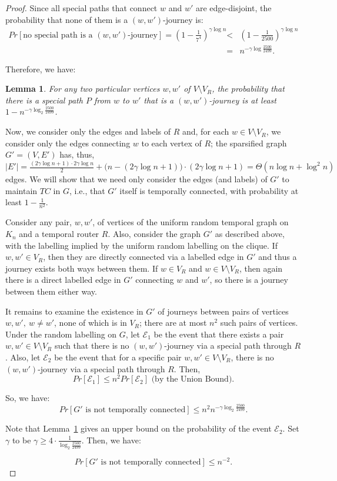 \documentclass[a4paper,UKenglish]{article}
\newtheorem{lemma}{Lemma}
\begin{document}
\begin{proof}
Since all special paths that connect $w$ and $w'$ are edge-disjoint, the probability that none of them is a $(w,w')$-journey is:
\begin{eqnarray*}
Pr[\text{no special path is a }(w,w') \text{-journey}] = \left( 1- \frac{1}{7^4} \right)^{\gamma \log{n}} &<& \left( 1- \frac{1}{2500} \right)^{\gamma \log{n}} \\
 &=&  n^{-\gamma \log{\frac{2500}{2499}}}.
\end{eqnarray*}

Therefore, we have:
\begin{lemma}\label{lem:no_journey}
For any two particular vertices $w,w'$ of $V\setminus V_R$, the probability that there is a special path $P$ from $w$ to $w'$ that is a $(w,w')$-journey is at least $1-n^{-\gamma \log_2{\frac{2500}{2499}}}$.
\end{lemma}

Now, we consider only the edges and labels of $R$ and, for each $w\in V\setminus V_R$, we consider only the edges connecting $w$ to each vertex of $R$; the sparsified graph $G'=(V,E')$ has, thus, $|E'|= \frac{(2\gamma \log{n} +1) \cdot 2 \gamma \log{n}}{2} +\big( n-(2\gamma \log{n}+1) \big) \cdot (2\gamma \log{n} +1)=\Theta(n\log{n}+ \log^2{n})$ edges. We will show that we need only consider the edges (and labels) of $G'$ to maintain $TC$ in $G$, i.e., that $G'$ itself is temporally connected, with probability at least $1-\frac{1}{n^2}$.

Consider any pair, $w,w'$, of vertices of the uniform random temporal graph on $K_n$ and a temporal router $R$. Also, consider the graph $G'$ as described above, with the labelling implied by the uniform random labelling on the clique. If $w,w'\in V_R$, then they are directly connected via a labelled edge in $G'$ and thus a journey exists both ways between them. If $w \in V_R$ and $w \in V\setminus V_R$, then again there is a direct labelled edge in $G'$ connecting $w$ and $w'$, so there is a journey between them either way.

It remains to examine the existence in $G'$ of journeys between pairs of vertices $w, w',~w\not= w'$, none of which is in $V_R$; there are at most $n^2$ such pairs of vertices. Under the random labelling on $G$, let $\mathcal{E}_1$ be the event that there exists a pair $w, w' \in V\setminus V_R$ such that there is no $(w,w')$-journey via a special path through $R$. Also, let $\mathcal{E}_2$ be the event that for a specific pair $w, w' \in V\setminus V_R$, there is no $(w,w')$-journey via a special path through $R$. Then,
\[ Pr[\mathcal{E}_1] \leq n^2 Pr[\mathcal{E}_2] \text{ (by the Union Bound).}\]

So, we have:
\[ Pr[G' \text{ is not temporally connected}] \leq n^2 n^{-\gamma \log_2{\frac{2500}{2499}}}. \]

Note that Lemma~\ref{lem:no_journey} gives an upper bound on the probability of the event $\mathcal{E}_2$. Set $\gamma$ to be $\gamma \geq 4 \cdot \frac{1}{\log_2{\frac{2500}{2499}}}$. Then, we have:

\[ Pr[G' \text{ is not temporally connected}] \leq n^{-2} . \]
\end{proof}
\end{document}
